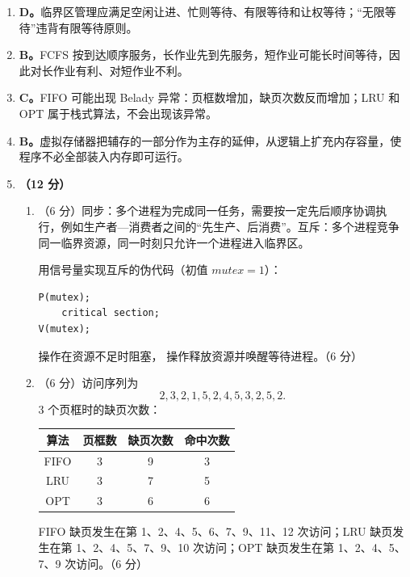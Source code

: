\documentclass[a4paper,11pt]{article}
\begin{document}
\begin{enumerate}[start=8, label=\textbf{\arabic*.}, leftmargin=2.4em, itemsep=0.45em]

\item \textbf{D。}临界区管理应满足空闲让进、忙则等待、有限等待和让权等待；“无限等待”违背有限等待原则。

\item \textbf{B。}FCFS 按到达顺序服务，长作业先到先服务，短作业可能长时间等待，因此对长作业有利、对短作业不利。

\item \textbf{C。}FIFO 可能出现 Belady 异常：页框数增加，缺页次数反而增加；LRU 和 OPT 属于栈式算法，不会出现该异常。

\item \textbf{B。}虚拟存储器把辅存的一部分作为主存的延伸，从逻辑上扩充内存容量，使程序不必全部装入内存即可运行。

\item \textbf{（12 分）}
\begin{enumerate}[label=（\arabic*）, leftmargin=2.2em, itemsep=2pt]
  \item （6 分）同步：多个进程为完成同一任务，需要按一定先后顺序协调执行，例如生产者—消费者之间的“先生产、后消费”。互斥：多个进程竞争同一临界资源，同一时刻只允许一个进程进入临界区。
  
  用信号量实现互斥的伪代码（初值 $mutex=1$）：
\begin{lstlisting}
P(mutex);
    critical section;
V(mutex);
\end{lstlisting}
   操作在资源不足时阻塞， 操作释放资源并唤醒等待进程。\hfill（6 分）

  \item （6 分）访问序列为
  \[
  2,3,2,1,5,2,4,5,3,2,5,2.
  \]
  3 个页框时的缺页次数：
  \begin{center}\small
  \begin{tabular}{cccc}
  \toprule
  算法 & 页框数 & 缺页次数 & 命中次数 \\
  \midrule
  FIFO & 3 & 9 & 3 \\
  LRU & 3 & 7 & 5 \\
  OPT & 3 & 6 & 6 \\
  \bottomrule
  \end{tabular}
  \end{center}
  FIFO 缺页发生在第 1、2、4、5、6、7、9、11、12 次访问；LRU 缺页发生在第 1、2、4、5、7、9、10 次访问；OPT 缺页发生在第 1、2、4、5、7、9 次访问。\hfill（6 分）
\end{enumerate}

\end{enumerate}
\end{document}
